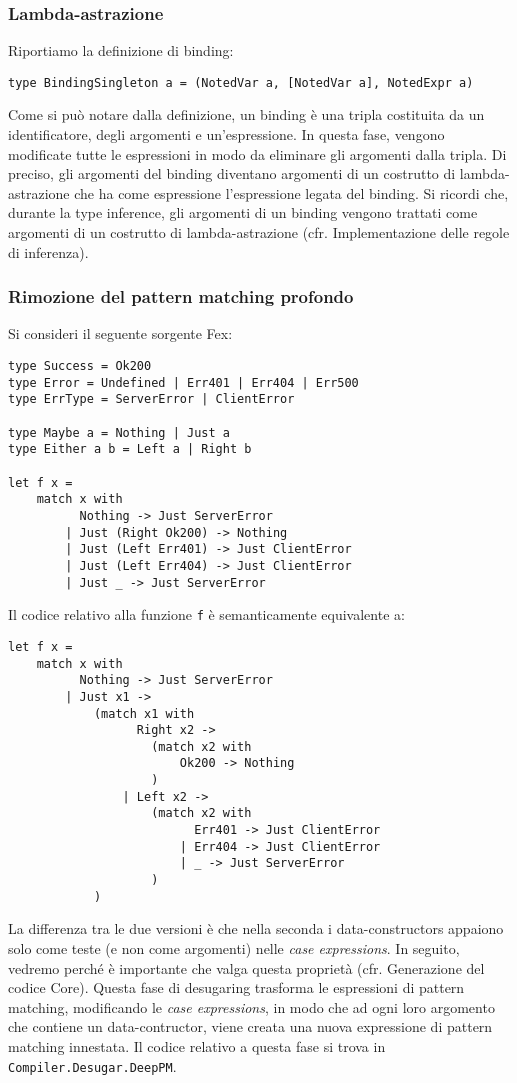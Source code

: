 \documentclass[10pt,a4paper]{article}
\begin{document}
\subsubsection{Lambda-astrazione}
Riportiamo la definizione di binding:
\begin{lstlisting}
type BindingSingleton a = (NotedVar a, [NotedVar a], NotedExpr a)
\end{lstlisting}
Come si può notare dalla definizione, un binding è una tripla costituita da un identificatore, degli argomenti e
un'espressione. In questa fase, vengono modificate tutte le espressioni in modo da eliminare gli argomenti dalla
tripla. Di preciso, gli argomenti del binding diventano argomenti di un costrutto di lambda-astrazione che ha come
espressione l'espressione legata del binding. Si ricordi che, durante la type inference, gli argomenti di un binding
vengono trattati come argomenti di un costrutto di lambda-astrazione (cfr. Implementazione delle regole di inferenza).

\subsubsection{Rimozione del pattern matching profondo}
Si consideri il seguente sorgente Fex:
\begin{lstlisting}
type Success = Ok200
type Error = Undefined | Err401 | Err404 | Err500
type ErrType = ServerError | ClientError

type Maybe a = Nothing | Just a
type Either a b = Left a | Right b

let f x =
    match x with
          Nothing -> Just ServerError
        | Just (Right Ok200) -> Nothing
        | Just (Left Err401) -> Just ClientError
        | Just (Left Err404) -> Just ClientError
        | Just _ -> Just ServerError
\end{lstlisting}
Il codice relativo alla funzione \texttt{f} è semanticamente equivalente a:
\begin{lstlisting}
let f x =
    match x with
          Nothing -> Just ServerError
        | Just x1 ->
            (match x1 with
                  Right x2 ->
                    (match x2 with
                        Ok200 -> Nothing
                    )
                | Left x2 ->
                    (match x2 with
                          Err401 -> Just ClientError
                        | Err404 -> Just ClientError
                        | _ -> Just ServerError
                    )
            )
\end{lstlisting}
La differenza tra le due versioni è che nella seconda i data-constructors appaiono solo come teste (e non come argomenti)
nelle \textit{case expressions}. In seguito, vedremo perché è importante che valga questa proprietà (cfr. Generazione del
codice Core). Questa fase di desugaring trasforma le espressioni di pattern matching, modificando le
\textit{case expressions}, in modo che ad ogni loro argomento che contiene un data-contructor, viene creata una nuova
expressione di pattern matching innestata. Il codice relativo a questa fase si trova in \texttt{Compiler.Desugar.DeepPM}.
\end{document}
